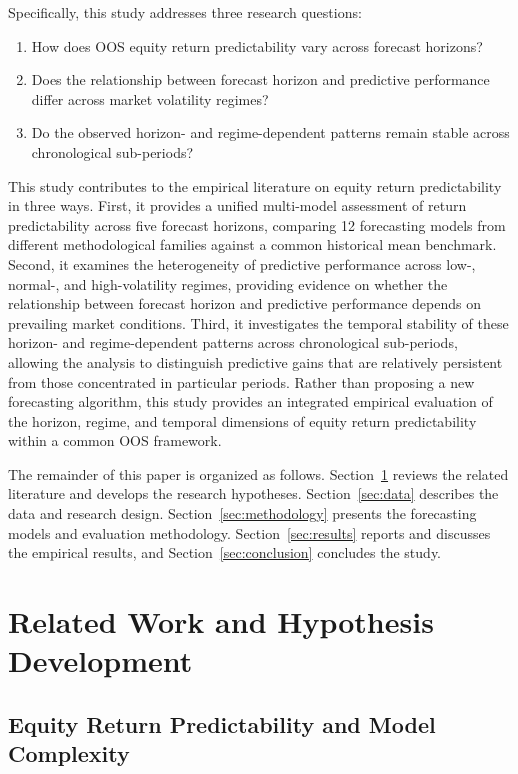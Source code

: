 \documentclass[12pt,twoside]{ord}
\begin{document}
Specifically, this study addresses three research questions:
\begin{enumerate}
\item How does OOS equity return predictability vary across forecast horizons?
\item Does the relationship between forecast horizon and predictive performance differ across market volatility regimes?
\item Do the observed horizon- and regime-dependent patterns remain stable across chronological sub-periods?
\end{enumerate}

This study contributes to the empirical literature on equity return predictability in three ways. First, it provides a unified multi-model assessment of return predictability across five forecast horizons, comparing 12 forecasting models from different methodological families against a common historical mean benchmark. Second, it examines the heterogeneity of predictive performance across low-, normal-, and high-volatility regimes, providing evidence on whether the relationship between forecast horizon and predictive performance depends on prevailing market conditions. Third, it investigates the temporal stability of these horizon- and regime-dependent patterns across chronological sub-periods, allowing the analysis to distinguish predictive gains that are relatively persistent from those concentrated in particular periods. Rather than proposing a new forecasting algorithm, this study provides an integrated empirical evaluation of the horizon, regime, and temporal dimensions of equity return predictability within a common OOS framework.

The remainder of this paper is organized as follows. Section~\ref{sec:lit_review} reviews the related literature and develops the research hypotheses. Section~\ref{sec:data} describes the data and research design. Section~\ref{sec:methodology} presents the forecasting models and evaluation methodology. Section~\ref{sec:results} reports and discusses the empirical results, and Section~\ref{sec:conclusion} concludes the study.


\section{Related Work and Hypothesis Development}\label{sec:lit_review}

\subsection{Equity Return Predictability and Model Complexity}
\end{document}
